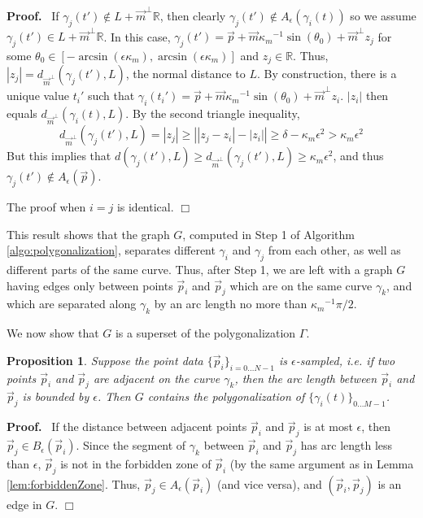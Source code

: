 \documentclass{article}
\newcommand{\nin}{\not\in}
\newtheorem{proposition}[cntr]{Proposition}
\newenvironment{proof}{
  \noindent\textbf{Proof.}\ }{\hspace*{\fill}
  \begin{math}\Box\end{math}\medskip}
\numberwithin{cntr}{section}
\numberwithin{equation}{section}
\newcommand{\abs}[1]{\left| #1 \right|}%
\newcommand{\RR}[0]{{\mathbb{R}}}
\newcommand{\vp}[0]{{\vec{p}}}
\newcommand{\vm}[0]{{\vec{m}}}
\newcommand{\Oto}[1]{{0 \ldots #1-1}}
\newcommand{\OtoN}{{0 \ldots N-1}}
\newcommand{\pointData}{{ \{ \vp_{i} \}_{i=\OtoN} }}
\newcommand{\curveSet}{{ \{ \gamma_i(t) \}_{\Oto{M}}}}
\newcommand{\ball}[2]{ { B_{#1}(#2) } }
\newcommand{\allowed}[2]{ { A_{#1}(#2) } }
\newcommand{\curvemax}{{\kappa_{m}}}
\newcommand{\curvemaxi}{{\curvemax^{-1}}}
\begin{document}
\begin{proof}
If $\gamma_{j}(t') \nin L+\vm^{\perp} \RR$, 
then clearly $\gamma_{j}(t') \nin \allowed{\epsilon}{\gamma_{i}(t)}$ 
so we assume $\gamma_{j}(t') \in L+\vm^{\perp} \RR$. In this case, 
$\gamma_{j}(t') = \vp + \vm \curvemaxi \sin(\theta_{0}) + \vm^\perp z_j$ 
for some $\theta_0 \in 
[-\arcsin(\epsilon \curvemax),\arcsin(\epsilon \curvemax)]$
and $z_j \in \RR$.
Thus, $|z_j| = d_{\vm^{\perp}}(\gamma_{j}(t'), L)$,
the normal distance to $L$. By construction, there is a unique
value $t_i'$ such that
$\gamma_{i}(t_i') = \vp + \vm \curvemaxi \sin(\theta_{0}) + \vm^\perp z_i$.
$|z_i|$ then equals $d_{\vm^{\perp}}(\gamma_{i}(t), L)$.
By the second triangle inequality,
\begin{equation*}
  d_{\vm^{\perp}}(\gamma_{j}(t'), L)  = |z_j|
  \geq \abs{|z_j - z_i| - |z_i|}
  \geq \delta - \curvemax \epsilon^{2} > \curvemax \epsilon^{2}
\end{equation*}
But this implies that $d(\gamma_{j}(t'), L) \geq d_{\vm^{\perp}}(\gamma_{j}(t'), L) \geq \curvemax \epsilon^{2}$, and thus $\gamma_{j}(t') \nin \allowed{\epsilon}{\vp}$.

The proof when $i=j$ is identical.
\end{proof}

This result shows that the graph $G$, computed in Step 1 of Algorithm \ref{algo:polygonalization}, separates different $\gamma_{i}$ and $\gamma_{j}$ from each other, as well as different parts of the same curve. Thus, after Step 1, we are left with a graph $G$ having edges only between points $\vp_{i}$ and $\vp_{j}$ which are on the same curve $\gamma_{k}$, and which are separated along $\gamma_{k}$ by an arc length no more than $\curvemaxi \pi/2$.

We now show that $G$ is a superset of the polygonalization $\Gamma$.

\begin{proposition}
  \label{prop:polyIncludesNeighboringPoints}
  Suppose the point data $\pointData$ is $\epsilon$-sampled, i.e. if two points $\vp_{i}$ and $\vp_{j}$ are adjacent on the curve $\gamma_{k}$, then the \emph{arc length} between $\vp_{i}$ and $\vp_{j}$ is bounded by $\epsilon$. Then $G$ contains the polygonalization of $\curveSet$.
\end{proposition}
\begin{proof}
  If the distance between adjacent points $\vp_{i}$ and $\vp_{j}$ is at most $\epsilon$, then $\vp_{j} \in \ball{\epsilon}{\vp_{i}}$. Since the segment of $\gamma_{k}$ between $\vp_{i}$ and $\vp_{j}$ has arc length less than $\epsilon$, $\vp_{j}$ is not in the forbidden zone of $\vp_{i}$ (by the same argument as in Lemma \ref{lem:forbiddenZone}. Thus, $\vp_{j} \in \allowed{\epsilon}{\vp_{i}}$ (and vice versa), and $(\vp_{i},\vp_{j})$ is an edge in $G$.
\end{proof}
\end{document}

